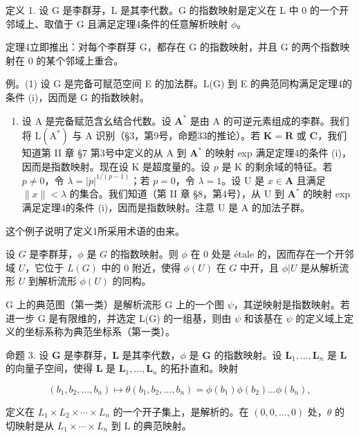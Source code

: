 定义 1. 设 G 是李群芽，L 是其李代数。G 的指数映射是定义在 L 中 0 的一个开邻域上、取值于 G 且满足定理4条件的任意解析映射 \(\phi\)。

定理4立即推出：对每个李群芽 G，都存在 G 的指数映射，并且 G 的两个指数映射在 0 的某个邻域上重合。

例。(1) 设 G 是完备可赋范空间 E 的加法群。L(G) 到 E 的典范同构满足定理4的条件 (i)，因而是 G 的指数映射。

\begin{enumerate}
\def\labelenumi{(\arabic{enumi})}
\setcounter{enumi}{1}
\tightlist
\item
  设 A 是完备赋范含幺结合代数。设 \(\mathbf{A}^*\) 是由 A 的可逆元素组成的李群。我们将 \(\mathrm{L}(\mathrm{A}^*)\) 与 A 识别（§3，第9号，命题33的推论）。若 \(\mathbf{K} = \mathbf{R}\) 或 \(\mathbf{C}\)，我们知道第 II 章 §7 第3号中定义的从 A 到 \(\mathbf{A}^*\) 的映射 exp 满足定理4的条件 (i)，因而是指数映射。现在设 K 是超度量的。设 \(p\) 是 K 的剩余域的特征。若 \(p \neq 0\)，令 \(\lambda = |p|^{1/(p-1)}\)；若 \(p = 0\)，令 \(\lambda = 1\)。设 U 是 \(x \in \mathbf{A}\) 且满足 \(\|x\| < \lambda\) 的集合。我们知道（第 II 章 §8，第4号），从 U 到 \(\mathbf{A}^*\) 的映射 exp 满足定理4的条件 (i)，因而是指数映射。注意 U 是 A 的加法子群。
\end{enumerate}

这个例子说明了定义1所采用术语的由来。

设 \(G\) 是李群芽，\(\phi\) 是 \(G\) 的指数映射。则 \(\phi\) 在 0 处是 étale 的，因而存在一个开邻域 \(U\)，它位于 \(L(G)\) 中的 0 附近，使得 \(\phi(U)\) 在 \(G\) 中开，且 \(\phi|U\) 是从解析流形 \(U\) 到解析流形 \(\phi(U)\) 的同构。

G 上的典范图（第一类）是解析流形 G 上的一个图 \(\psi\)，其逆映射是指数映射。若进一步 G 是有限维的，并选定 L(G) 的一组基，则由 \(\psi\) 和该基在 \(\psi\) 的定义域上定义的坐标系称为典范坐标系（第一类）。

命题 3. 设 \(\mathbf{G}\) 是李群芽，\(\mathbf{L}\) 是其李代数，\(\phi\) 是 \(\mathbf{G}\) 的指数映射。设 \(\mathbf{L}_1, \ldots, \mathbf{L}_n\) 是 \(\mathbf{L}\) 的向量子空间，使得 \(\mathbf{L}\) 是 \(\mathbf{L}_1, \ldots, \mathbf{L}_n\) 的拓扑直和。映射

\[
(b _ {1}, b _ {2}, \dots , b _ {n}) \mapsto \theta (b _ {1}, b _ {2}, \dots , b _ {n}) = \phi (b _ {1}) \phi (b _ {2}) \dots \phi (b _ {n}),
\]

定义在 \(L_{1} \times L_{2} \times \cdots \times L_{n}\) 的一个开子集上，是解析的。在 \((0, 0, \ldots, 0)\) 处，\(\theta\) 的切映射是从 \(L_{1} \times \cdots \times L_{n}\) 到 L 的典范映射。


